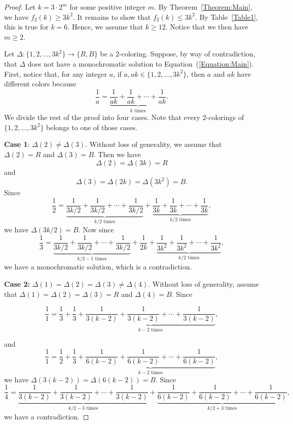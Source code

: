 \documentclass[10pt,a4paper]{amsart}
\begin{document}
\begin{proof}
    Let $k=3\cdot2^m$ for some positive integer $m$. By Theorem~\ref{Theorem:Main}, we have $f_2(k)\geq3k^2$. It remains to show that $f_2(k)\leq 3k^2$. By Table~\ref{Table1}, this is true for $k=6$. Hence, we assume that $k\geq12$. Notice that we then have $m\geq2$.


Let $\Delta:\{1,2,\ldots,3k^2\}\to\{R,B\}$ be a $2$-coloring. Suppose, by way of contradiction, that $\Delta$ does not have a monochromatic solution to Equation~(\ref{Equation:Main}). First, notice that, for any integer $a$, if $a,ak\in\{1,2,\ldots,3k^2\}$, then $a$ and $ak$ have different colors because
\[
\frac{1}{a}=\underbrace{\frac{1}{ak}+\frac{1}{ak}+\cdots+\frac{1}{ak}}_{k\text{ times}}.
\]
We divide the rest of the proof into four cases. Note that every 2-colorings of $\{1,2,\ldots,3k^2\}$ belongs to one of those cases.

\textbf{Case 1}: $\Delta(2)\neq\Delta(3)$. Without loss of generality, we assume that $\Delta(2)=R$ and $\Delta(3)=B$. Then we have
    \[
    \Delta(2)=\Delta(3k)=R
    \]
    and
    \[
    \Delta(3)=\Delta(2k)=\Delta(3k^2)=B.
    \]
Since
    \[
    \frac{1}{2}=\underbrace{\frac{1}{3k/2}+\frac{1}{3k/2}+\cdots+\frac{1}{3k/2}}_{k/2\text{ times}}+\underbrace{\frac{1}{3k}+\frac{1}{3k}+\cdots+\frac{1}{3k}}_{k/2\text{ times}},
    \]
    we have $\Delta(3k/2)=B$. Now since
\[\frac{1}{3}=\underbrace{\frac{1}{3k/2}+\frac{1}{3k/2}+\cdots+\frac{1}{3k/2}}_{k/2-1\text{ times}}+\frac{1}{2k}+\underbrace{\frac{1}{3k^2}+\frac{1}{3k^2}+\cdots+\frac{1}{3k^2}}_{k/2\text{ times}},\]
we have a monochromatic solution, which is a contradiction.

\textbf{Case 2:} $\Delta(1)=\Delta(2)=\Delta(3)\neq\Delta(4)$. Without loss of generality, assume that $\Delta(1)=\Delta(2)=\Delta(3)=R$ and $\Delta(4)=B$. Since

\[
\frac{1}{1}=\frac{1}{3}+\frac{1}{3}+\underbrace{\frac{1}{3(k-2)}+\frac{1}{3(k-2)}+\cdots+\frac{1}{3(k-2)}}_{k-2\text{ times}},
\]

and
\[
\frac{1}{1}=\frac{1}{2}+\frac{1}{3}+\underbrace{\frac{1}{6(k-2)}+\frac{1}{6(k-2)}+\cdots+\frac{1}{6(k-2)}}_{k-2\text{ times}},
\]
we have $\Delta(3(k-2))=\Delta(6(k-2))=B$. Since
\[
\frac{1}{4}=\underbrace{\frac{1}{3(k-2)}+\frac{1}{3(k-2)}+\cdots+\frac{1}{3(k-2)}}_{k/2-3\text{ times}}+\underbrace{\frac{1}{6(k-2)}+\frac{1}{6(k-2)}+\cdots+\frac{1}{6(k-2)}}_{k/2+3\text{ times}},
\]
we have a contradiction.


\end{proof}
\end{document}

